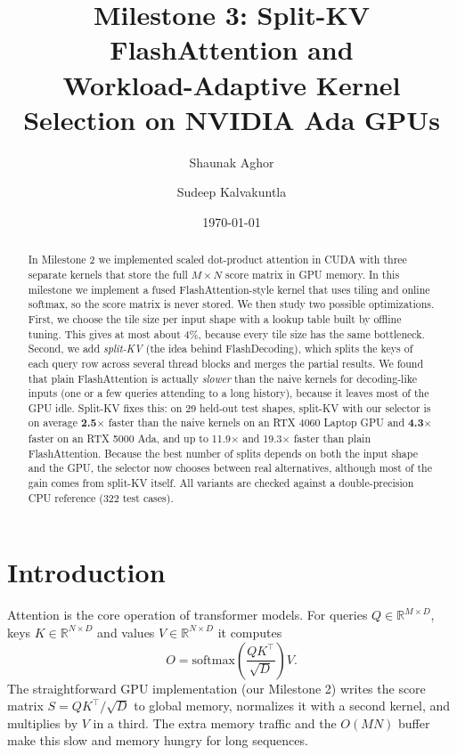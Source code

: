 \documentclass[11pt]{article}
\title{Milestone 3: Split-KV FlashAttention and\\Workload-Adaptive Kernel Selection on NVIDIA Ada GPUs}
\author{Shaunak Aghor \and Sudeep Kalvakuntla}
\date{\today}
\begin{document}
\maketitle

\begin{abstract}
In Milestone 2 we implemented scaled dot-product attention in CUDA with three
separate kernels that store the full $M \times N$ score matrix in GPU memory.
In this milestone we implement a fused FlashAttention-style kernel that uses
tiling and online softmax, so the score matrix is never stored. We then
study two possible optimizations. First, we choose the tile size per input
shape with a lookup table built by offline tuning. This gives at most about
4\%, because every tile size has the same bottleneck. Second, we add
\emph{split-KV} (the idea behind FlashDecoding), which splits the keys of each
query row across several thread blocks and merges the partial results.
We found that plain FlashAttention is actually \emph{slower} than the naive kernels
for decoding-like inputs (one or a few queries attending to a long history),
because it leaves most of the GPU idle. Split-KV fixes this: on 29 held-out
test shapes, split-KV with our selector is on average \textbf{2.5$\times$} faster
than the naive kernels on an RTX 4060 Laptop GPU and \textbf{4.3$\times$} faster
on an RTX 5000 Ada, and up to 11.9$\times$ and 19.3$\times$ faster than plain
FlashAttention. Because the best number of splits depends on both the input
shape and the GPU, the selector now chooses between real alternatives, although
most of the gain comes from split-KV itself.
All variants are checked against a double-precision CPU reference
(322 test cases).
\end{abstract}

\section{Introduction}

Attention is the core operation of transformer models. For queries
$Q \in \mathbb{R}^{M \times D}$, keys $K \in \mathbb{R}^{N \times D}$ and values
$V \in \mathbb{R}^{N \times D}$ it computes
\begin{equation}
  O = \mathrm{softmax}\!\left(\frac{QK^\top}{\sqrt{D}}\right) V .
\end{equation}
The straightforward GPU implementation (our Milestone 2) writes the score
matrix $S = QK^\top/\sqrt{D}$ to global memory, normalizes it with a second
kernel, and multiplies by $V$ in a third. The extra memory traffic and the
$O(MN)$ buffer make this slow and memory hungry for long sequences.
\end{document}
